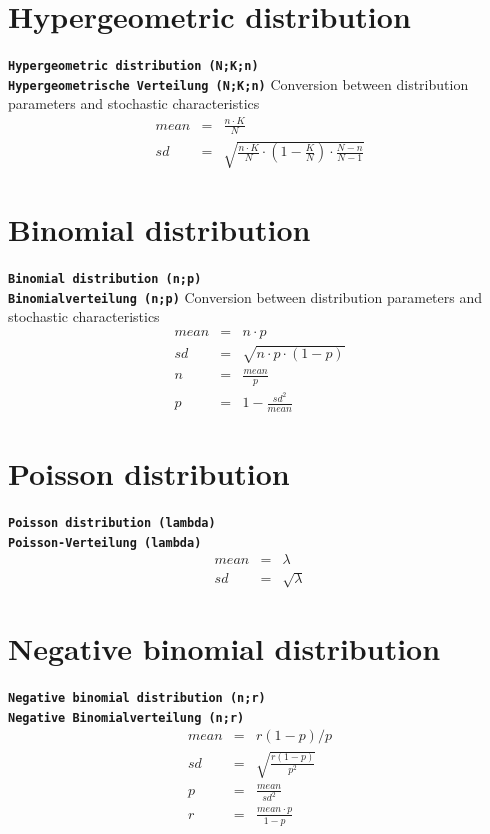 \documentclass{svmono}
\def\cm#1{\textbf{\texttt{#1}}}
\begin{document}
\section*{Hypergeometric distribution}
\cm{Hypergeometric distribution (N;K;n)}~\\
\cm{Hypergeometrische Verteilung (N;K;n)}
Conversion between distribution parameters and stochastic characteristics
\begin{eqnarray*}
mean&=&\frac{n\cdot K}{N}\\
sd&=&\sqrt{\frac{n\cdot K}{N}\cdot\left(1-\frac{K}{N}\right)\cdot\frac{N-n}{N-1}}
\end{eqnarray*}





\section*{Binomial distribution}
\cm{Binomial distribution (n;p)}~\\
\cm{Binomialverteilung (n;p)}
Conversion between distribution parameters and stochastic characteristics
\begin{eqnarray*}
mean&=&n\cdot p\\
sd&=&\sqrt{n\cdot p\cdot (1-p)}\\
n&=&\frac{mean}{p}\\
p&=&1-\frac{sd^2}{mean}
\end{eqnarray*}





\section*{Poisson distribution}
\cm{Poisson distribution (lambda)}~\\
\cm{Poisson-Verteilung (lambda)}
\begin{eqnarray*}
mean&=&\lambda\\
sd&=&\sqrt{\lambda}
\end{eqnarray*}





\section*{Negative binomial distribution}
\cm{Negative binomial distribution (n;r)}~\\
\cm{Negative Binomialverteilung (n;r)}
\begin{eqnarray*}
mean&=&r(1-p)/p\\
sd&=&\sqrt{\frac{r(1-p)}{p^2}}\\
p&=&\frac{mean}{sd^2}\\
r&=&\frac{mean\cdot p}{1-p}
\end{eqnarray*}
\end{document}
